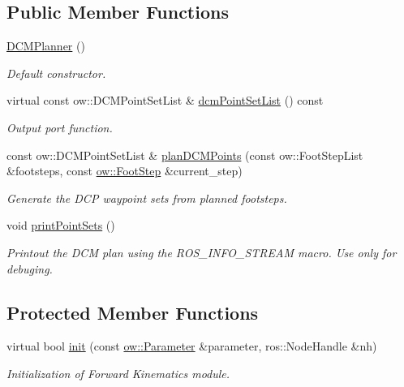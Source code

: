 \subsection*{Public Member Functions}
\begin{DoxyCompactItemize}
\item 
\hyperlink{classow__dcm__planner_1_1DCMPlanner_a936a295d300754f1c9a2ac6ed8005e01}{D\+C\+M\+Planner} ()\hypertarget{classow__dcm__planner_1_1DCMPlanner_a936a295d300754f1c9a2ac6ed8005e01}{}\label{classow__dcm__planner_1_1DCMPlanner_a936a295d300754f1c9a2ac6ed8005e01}

\begin{DoxyCompactList}\small\item\em Default constructor. \end{DoxyCompactList}\item 
virtual const ow\+::\+D\+C\+M\+Point\+Set\+List \& \hyperlink{classow__dcm__planner_1_1DCMPlanner_a10243a996a2c39e9999dfddb922f234b}{dcm\+Point\+Set\+List} () const 
\begin{DoxyCompactList}\small\item\em Output port function. \end{DoxyCompactList}\item 
const ow\+::\+D\+C\+M\+Point\+Set\+List \& \hyperlink{classow__dcm__planner_1_1DCMPlanner_a0f6bb0ac1fb616cd0c21a8f5e4ae8c7a}{plan\+D\+C\+M\+Points} (const ow\+::\+Foot\+Step\+List \&footsteps, const \hyperlink{classow__core_1_1FootStep}{ow\+::\+Foot\+Step} \&current\+\_\+step)
\begin{DoxyCompactList}\small\item\em Generate the D\+CP waypoint sets from planned footsteps. \end{DoxyCompactList}\item 
void \hyperlink{classow__dcm__planner_1_1DCMPlanner_aa85207c723117da5c350c33244af2a90}{print\+Point\+Sets} ()
\begin{DoxyCompactList}\small\item\em Printout the D\+CM plan using the R\+O\+S\+\_\+\+I\+N\+F\+O\+\_\+\+S\+T\+R\+E\+AM macro. Use only for debuging. \end{DoxyCompactList}\end{DoxyCompactItemize}
\subsection*{Protected Member Functions}
\begin{DoxyCompactItemize}
\item 
virtual bool \hyperlink{classow__dcm__planner_1_1DCMPlanner_ab846c11b13884d0f7ae1972de514b417}{init} (const \hyperlink{classow_1_1Parameter}{ow\+::\+Parameter} \&parameter, ros\+::\+Node\+Handle \&nh)
\begin{DoxyCompactList}\small\item\em Initialization of Forward Kinematics module. \end{DoxyCompactList}\end{DoxyCompactItemize}
